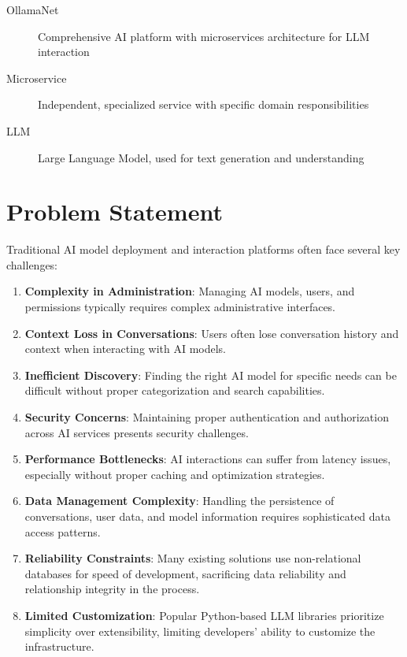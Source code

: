 \begin{terminology}
\begin{description}
\item[OllamaNet] Comprehensive AI platform with microservices architecture for LLM interaction
\item[Microservice] Independent, specialized service with specific domain responsibilities  
\item[LLM] Large Language Model, used for text generation and understanding
\end{description}
\end{terminology}

\section{Problem Statement}

Traditional AI model deployment and interaction platforms often face several key challenges:

\begin{enumerate}
    \item \textbf{Complexity in Administration}: Managing AI models, users, and permissions typically requires complex administrative interfaces.
    \item \textbf{Context Loss in Conversations}: Users often lose conversation history and context when interacting with AI models.
    \item \textbf{Inefficient Discovery}: Finding the right AI model for specific needs can be difficult without proper categorization and search capabilities.
    \item \textbf{Security Concerns}: Maintaining proper authentication and authorization across AI services presents security challenges.
    \item \textbf{Performance Bottlenecks}: AI interactions can suffer from latency issues, especially without proper caching and optimization strategies.
    \item \textbf{Data Management Complexity}: Handling the persistence of conversations, user data, and model information requires sophisticated data access patterns.
    \item \textbf{Reliability Constraints}: Many existing solutions use non-relational databases for speed of development, sacrificing data reliability and relationship integrity in the process.
    \item \textbf{Limited Customization}: Popular Python-based LLM libraries prioritize simplicity over extensibility, limiting developers' ability to customize the infrastructure.
\end{enumerate}

